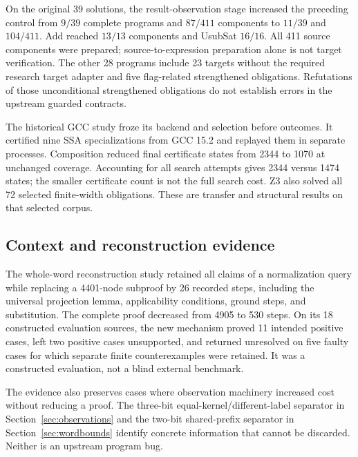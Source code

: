 On the original 39 solutions, the result-observation stage increased the preceding control from $9/39$ complete programs and $87/411$ components to $11/39$ and $104/411$. Add reached $13/13$ components and UsubSat $16/16$. All 411 source components were prepared; source-to-expression preparation alone is not target verification. The other 28 programs include 23 targets without the required research target adapter and five flag-related strengthened obligations. Refutations of those unconditional strengthened obligations do not establish errors in the upstream guarded contracts.

The historical GCC study froze its backend and selection before outcomes. It certified nine SSA specializations from GCC 15.2 and replayed them in separate processes. Composition reduced final certificate states from 2344 to 1070 at unchanged coverage. Accounting for all search attempts gives 2344 versus 1474 states; the smaller certificate count is not the full search cost. Z3 also solved all 72 selected finite-width obligations. These are transfer and structural results on that selected corpus.

\subsection{Context and reconstruction evidence}
The whole-word reconstruction study retained all claims of a normalization query while replacing a 4401-node subproof by 26 recorded steps, including the universal projection lemma, applicability conditions, ground steps, and substitution. The complete proof decreased from 4905 to 530 steps. On its 18 constructed evaluation sources, the new mechanism proved 11 intended positive cases, left two positive cases unsupported, and returned unresolved on five faulty cases for which separate finite counterexamples were retained. It was a constructed evaluation, not a blind external benchmark.

The evidence also preserves cases where observation machinery increased cost without reducing a proof. The three-bit equal-kernel/different-label separator in Section~\ref{sec:observations} and the two-bit shared-prefix separator in Section~\ref{sec:wordbounds} identify concrete information that cannot be discarded. Neither is an upstream program bug.

